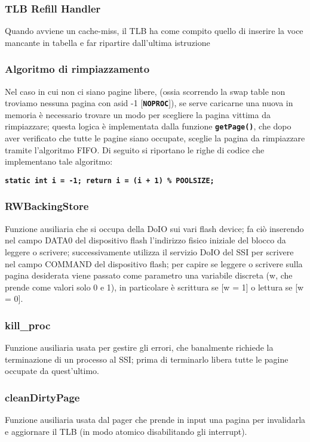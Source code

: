 \documentclass{article}
\begin{document}
	\newpage

	\subsubsection{TLB Refill Handler}
	Quando avviene un cache-miss, il TLB ha come compito quello di inserire la voce
	mancante in tabella e far ripartire dall'ultima istruzione

	\subsubsection{Algoritmo di rimpiazzamento}
	Nel caso in cui non ci siano pagine libere, (ossia scorrendo la swap table non
	troviamo nessuna pagina con asid -1 [\texttt{\textbf{NOPROC}}]), se serve
	caricarne una nuova in memoria è necessario trovare un modo per scegliere la
	pagina vittima da rimpiazzare; questa logica è implementata dalla funzione \texttt{\textbf{getPage()}},
	che dopo aver verificato che tutte le pagine siano occupate, sceglie la pagina
	da rimpiazzare tramite l'algoritmo FIFO. Di seguito si riportano le righe di codice
	che implementano tale algoritmo:

	\begin{center}
		\texttt{\textbf{static int i = -1; return i = (i + 1) \% POOLSIZE;}}
	\end{center}

	\subsubsection{RWBackingStore}
	Funzione ausiliaria che si occupa della DoIO sui vari flash device; fa ciò inserendo
	nel campo DATA0 del dispositivo flash l'indirizzo fisico iniziale del blocco da
	leggere o scrivere; successivamente utilizza il servizio DoIO del SSI per
	scrivere nel campo COMMAND del dispositivo flash; per capire se leggere o scrivere
	sulla pagina desiderata viene passato come parametro una variabile discreta (w,
	che prende come valori solo 0 e 1), in particolare è scrittura se [w = 1] o lettura
	se [w = 0].

	\subsubsection{kill\_proc}
	Funzione ausiliaria usata per gestire gli errori, che banalmente richiede la
	terminazione di un processo al SSI; prima di terminarlo libera tutte le pagine
	occupate da quest'ultimo.

	\subsubsection{cleanDirtyPage}
	Funzione ausiliaria usata dal pager che prende in input una pagina per invalidarla
	e aggiornare il TLB (in modo atomico disabilitando gli interrupt).
\end{document}
